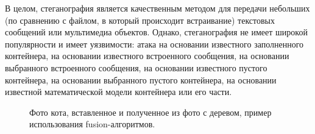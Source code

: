 В целом, стеганография является качественным методом для передачи небольших (по сравнению с файлом, в который происходит встраивание) текстовых сообщений или мультимедиа объектов. Однако, стеганография не имеет широкой популярности и имеет уязвимости: атака на основании известного заполненного контейнера,  на основании известного встроенного сообщения,  на основании выбранного встроенного сообщения, на основании известного пустого контейнера, на основании выбранного пустого контейнера, на основании известной математической модели контейнера или его части.
\begin{figure*}[h!]
	\caption{ Фото кота, вставленное и полученное из фото с деревом, пример использования fusion-алгоритмов.}
\end{figure*} 

